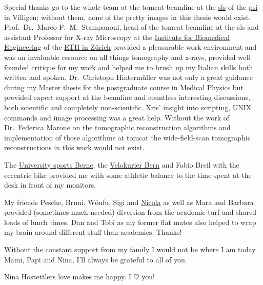 Special thanks go to the whole team at the \acs{tomcat} beamline at the \href{http://sls.web.psi.ch/}{\acl{sls}} of the \href{http://psi.ch/}{\acl{psi}} in Villigen; without them, none of the pretty images in this thesis would exist. Prof.\ Dr.\ Marco F.\ M.\ Stampanoni, head of the \acs{tomcat} beamline at the \acl{sls} and assistant Professor for X-ray Microscopy at the \href{http://www.biomed.ee.ethz.ch/}{Institute for Biomedical Engineering} of the \href{http://ethz.ch/}{ETH in Zürich} provided a pleasurable work environment and was an invaluable resource on all things tomography and x-rays, provided well founded critique for my work and helped me to brush up my Italian skills both written and spoken. Dr.\ Christoph Hintermüller was not only a great guidance during my Master thesis for the postgraduate course in Medical Physics but provided expert support at the beamline and countless interesting discussions, both scientific and completely non-scientific. Xris' insight into scripting, UNIX commands and image processing was a great help. Without the work of Dr.\ Federica Marone on the tomographic reconstruction algorithms and implementation of those algorithms at \acs{tomcat} the wide-field-scan tomographic reconstructions in this work would not exist.

The \href{http://www.sport.unibe.ch/}{University sports Berne}, the \href{http://velokurierbern.ch/}{Velokurier Bern} and Fabio Breil with the eccentric bike provided me with some athletic balance to the time spent at the desk in front of my monitors.

My friends Pesche, Bruni, Wöufu, Sigi and \href{http://www.nicolafrombern.com/}{Nicola} as well as Mara and Barbara provided (sometimes much needed) diversion from the academic turf and shared loads of lunch times. Dan and Tobi as my former flat mates also helped to wrap my brain around different stuff than academics. Thanks!

Without the constant support from my family I would not be where I am today. Mami, Papi and Nina, I'll always be grateful to all of you.

Nina Hostettlers love makes me happy. I {\color{red}$\heartsuit$} you!
\endgroup